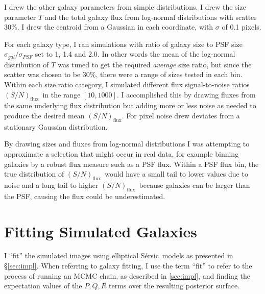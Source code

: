\documentclass[12pt,preprint]{aastex}
\newcommand{\fsn}{$(S/N)_{\textrm{flux}}$}
\newcommand{\sersic}{S\'{e}rsic}
\begin{document}
I drew the other galaxy parameters from simple distributions.  I drew the size
parameter $T$ and the total galaxy flux from log-normal distributions with
scatter 30\%.  I drew the centroid from a Gaussian in each coordinate, with
$\sigma$ of 0.1 pixels.

For each galaxy type, I ran simulations with ratio of galaxy size to PSF size
$\sigma_{gal}/\sigma_{PSF}$ set to 1, 1.4 and 2.0.  In other words the mean of
the log-normal distribution of $T$ was tuned to get the required {\it average}
size ratio, but since the scatter was chosen to be 30\%, there were a range of
sizes tested in each bin.  Within each size ratio category, I simulated
different flux signal-to-noise ratios \fsn\ in the range $[10,1000]$.  I
accomplished this by drawing fluxes from the same underlying flux distribution
but adding more or less noise as needed to produce the desired mean \fsn.  For
pixel noise drew deviates from a stationary Gaussian distribution.

By drawing sizes and fluxes from log-normal distributions I was attempting to
approximate a selection that might occur in real data, for example binning
galaxies by a robust flux measure such as a PSF flux.  Within a PSF flux bin,
the true distribution of \fsn\ would have a small tail to lower values due to
noise and a long tail to higher \fsn\ because galaxies can be larger than the
PSF, causing the flux could be underestimated.


\section{Fitting Simulated Galaxies} \label{sec:simfit}

I ``fit'' the simulated images using elliptical \sersic\ models as presented in
\S \ref{sec:impl}.   When referring to galaxy fitting, I use the term ``fit''
to refer to the process of running an MCMC chain, as described in
\ref{sec:impl}, and finding the expectation values of the $P,Q,R$ terms over
the resulting posterior surface.
\end{document}
